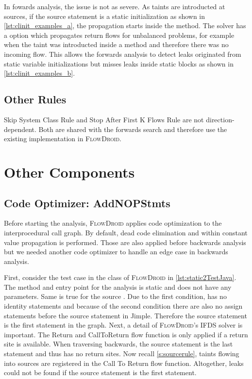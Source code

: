 \documentclass[../draft.tex]{subfiles}
\begin{document}
    In fowards analysis, the issue is not as severe. As taints are introducted at sources, if the source statement is a static initialization as shown in \autoref{lst:clinit_examples_a}, the propagation starts inside the  method. The solver has a  option which propagates return flows for unbalanced problems, for example when the taint was introducted inside a method and therefore there was no incoming flow. This allows the forwards analysis to detect leaks originated from static variable initializations but misses leaks inside static blocks as shown in \autoref{lst:clinit_examples_b}.

    \subsection{Other Rules}
    Skip System Class Rule and Stop After First K Flows Rule are not direction-dependent. Both are shared with the forwards search and therefore use the existing implementation in \textsc{FlowDroid}.
    

    \section{Other Components}
    \subsection{Code Optimizer: AddNOPStmts}
    Before starting the analysis, \textsc{FlowDroid} applies code optimization to the interprocedural call graph. By default, dead code elimination and within constant value propagation is performed. Those are also applied before backwards analysis but we needed another code optimizer to handle an edge case in backwards analysis.

    First, consider the  test case in the  class of \textsc{FlowDroid} in \autoref{lst:static2TestJava}. The method and entry point for the analysis  is static and does not have any parameters. Same is true for the source . Due to the first condition,  has no identity statements and because of the second condition there are also no assign statements before the source statement in Jimple. Therefore the source statement is the first statement in the graph. 
    Next, a detail of \textsc{FlowDroid}'s IFDS solver is important. The Return and CallToReturn flow function is only applied if a return site is available.
    When traversing backwards, the source statement is the last statement and thus has no return sites. Now recall \autoref{s:sourcerule}, taints flowing into sources are registered in the Call To Return flow function. Altogether, leaks could not be found if the source statement is the first statement.
\end{document}
